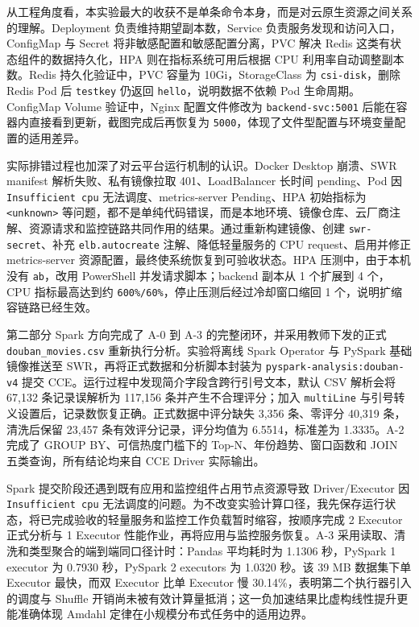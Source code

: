 \documentclass[bwprint]{report}
\begin{document}
从工程角度看，本实验最大的收获不是单条命令本身，而是对云原生资源之间关系的理解。Deployment 负责维持期望副本数，Service 负责服务发现和访问入口，ConfigMap 与 Secret 将非敏感配置和敏感配置分离，PVC 解决 Redis 这类有状态组件的数据持久化，HPA 则在指标系统可用后根据 CPU 利用率自动调整副本数。Redis 持久化验证中，PVC 容量为 10Gi，StorageClass 为 \texttt{csi-disk}，删除 Redis Pod 后 \texttt{testkey} 仍返回 \texttt{hello}，说明数据不依赖 Pod 生命周期。ConfigMap Volume 验证中，Nginx 配置文件修改为 \texttt{backend-svc:5001} 后能在容器内直接看到更新，截图完成后再恢复为 \texttt{5000}，体现了文件型配置与环境变量配置的适用差异。

实际排错过程也加深了对云平台运行机制的认识。Docker Desktop 崩溃、SWR manifest 解析失败、私有镜像拉取 401、LoadBalancer 长时间 pending、Pod 因 \texttt{Insufficient cpu} 无法调度、metrics-server Pending、HPA 初始指标为 \texttt{<unknown>} 等问题，都不是单纯代码错误，而是本地环境、镜像仓库、云厂商注解、资源请求和监控链路共同作用的结果。通过重新构建镜像、创建 \texttt{swr-secret}、补充 \texttt{elb.autocreate} 注解、降低轻量服务的 CPU request、启用并修正 metrics-server 资源配置，最终使系统恢复到可验收状态。HPA 压测中，由于本机没有 \texttt{ab}，改用 PowerShell 并发请求脚本；backend 副本从 1 个扩展到 4 个，CPU 指标最高达到约 \texttt{600\%/60\%}，停止压测后经过冷却窗口缩回 1 个，说明扩缩容链路已经生效。

第二部分 Spark 方向完成了 A-0 到 A-3 的完整闭环，并采用教师下发的正式 \texttt{douban\_movies.csv} 重新执行分析。实验将离线 Spark Operator 与 PySpark 基础镜像推送至 SWR，再将正式数据和分析脚本封装为 \texttt{pyspark-analysis:douban-v4} 提交 CCE。运行过程中发现简介字段含跨行引号文本，默认 CSV 解析会将 67,132 条记录误解析为 117,156 条并产生不合理评分；加入 \texttt{multiLine} 与引号转义设置后，记录数恢复正确。正式数据中评分缺失 3,356 条、零评分 40,319 条，清洗后保留 23,457 条有效评分记录，评分均值为 6.5514，标准差为 1.3335。A-2 完成了 GROUP BY、可信热度门槛下的 Top-N、年份趋势、窗口函数和 JOIN 五类查询，所有结论均来自 CCE Driver 实际输出。

Spark 提交阶段还遇到既有应用和监控组件占用节点资源导致 Driver/Executor 因 \texttt{Insufficient cpu} 无法调度的问题。为不改变实验计算口径，我先保存运行状态，将已完成验收的轻量服务和监控工作负载暂时缩容，按顺序完成 2 Executor 正式分析与 1 Executor 性能作业，再将应用与监控服务恢复。A-3 采用读取、清洗和类型聚合的端到端同口径计时：Pandas 平均耗时为 1.1306 秒，PySpark 1 executor 为 0.7930 秒，PySpark 2 executors 为 1.0320 秒。该 39 MB 数据集下单 Executor 最快，而双 Executor 比单 Executor 慢 30.14\%，表明第二个执行器引入的调度与 Shuffle 开销尚未被有效计算量抵消；这一负加速结果比虚构线性提升更能准确体现 Amdahl 定律在小规模分布式任务中的适用边界。
\end{document}
